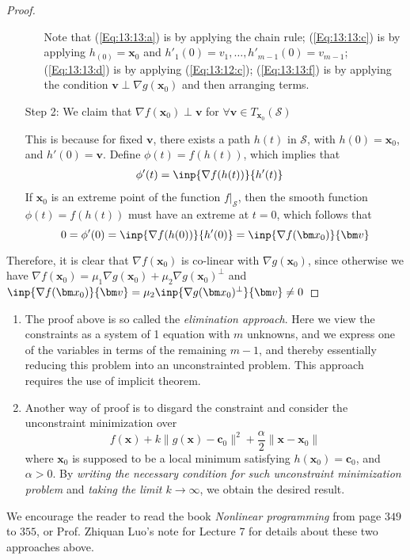 \begin{proof}
\begin{enumerate}
\begin{itemize}
Note that (\ref{Eq:13:13:a}) is by applying the chain rule; (\ref{Eq:13:13:c}) is by applying $h_(0)=\bm x_0$ and $h'_1(0)=v_1,\dots,h'_{m-1}(0)=v_{m-1}$; (\ref{Eq:13:13:d}) is by applying (\ref{Eq:13:12:c}); (\ref{Eq:13:13:f}) is by applying the condition $\bm v\perp\nabla g(\bm x_0)$ and then arranging terms.
\end{itemize}



\item[Step 2:]
We claim that $\nabla f(\bm x_0)\perp\bm v$ for $\forall\bm v\in T_{\bm x_0}(\mathcal{S})$

This is because for fixed $\bm v$, there exists a path $h(t)$ in $\mathcal{S}$, with $h(0)=\bm x_0$, and $h'(0)=\bm v$. Define $\phi(t)=f(h(t))$, which implies that
\[
\begin{aligned}
\phi'(t)&=\inp{\nabla f(h(t))}{h'(t)}
\end{aligned}
\]
If $\bm x_0$ is an extreme point of the function $f|_{\mathcal{S}}$, then the smooth function $\phi(t)=f(h(t))$ must have an extreme at $t=0$, which follows that 
\[
0=\phi'(0)=\inp{\nabla f(h(0))}{h'(0)}=\inp{\nabla f(\bm x_0)}{\bm v}
\]
\end{enumerate}
Therefore, it is clear that $\nabla f(\bm x_0)$ is co-linear with $\nabla g(\bm x_0)$, since otherwise we have $\nabla f(\bm x_0)=\mu_1\nabla g(\bm x_0)+\mu_2\nabla g(\bm x_0)^\perp$ and $\inp{\nabla f(\bm x_0)}{\bm v}=\mu_2\inp{\nabla g(\bm x_0)^\perp}{\bm v}\ne0$ 
\end{proof}
\begin{remark}
\begin{enumerate}
\item
The proof above is so called the \emph{elimination approach}. Here we view the constraints as a system of 1 equation with $m$ unknowns, and we express one of the variables in terms of the remaining $m-1$, and thereby essentially reducing this problem into an unconstrainted problem. This approach requires the use of implicit theorem.
\item
Another way of proof is to disgard the constraint and consider the unconstraint minimization over
\[
f(\bm x)+k\|g(\bm x)-\bm c_0\|^2+\frac{\alpha}{2}\|\bm x-\bm x_0\|
\] 
where $\bm x_0$ is supposed to be a local minimum satisfying $h(\bm x_0)=\bm c_0$, and $\alpha>0$. By \textit{writing the necessary condition for such unconstraint minimization problem} and \textit{taking the limit $k\to\infty$}, we obtain the desired result.
\end{enumerate}
We encourage the reader to read the book \textit{Nonlinear programming} from page $349$ to $355$, or Prof. Zhiquan Luo's note for Lecture 7 for details about these two approaches above.
\end{remark}

